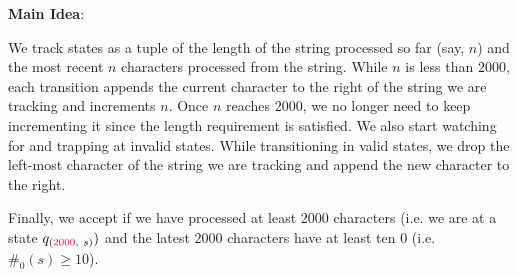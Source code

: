 \begin{Answer}
  \newpage
  \step
  \textbf{Main Idea}:

  \step
  We track states as a tuple of the length of the string processed so far (say, $n$)
  and the most recent $n$ characters processed from the string.
  While $n$ is less than $2000$, each transition appends the current character
  to the right of the string we are tracking and increments $n$.
  Once $n$ reaches $2000$, we no longer
  need to keep incrementing it since the length requirement is satisfied.
  We also start watching for and trapping at invalid states.
  While transitioning in valid states, we drop the left-most character
  of the string we are tracking and append the new character to the right.

  \step
  Finally, we accept if we have processed at least $2000$ characters
  (i.e. we are at a state $q_{(\crim{2000},\ s)})$
  and the latest $2000$ characters have at least ten $0$
  (i.e. $\#_0(s) \ge 10$).
\end{Answer}
